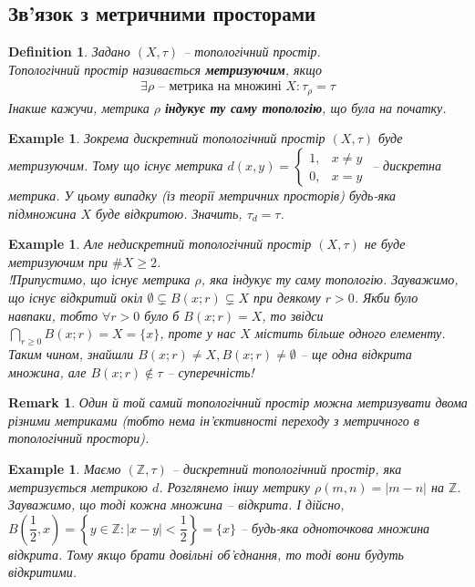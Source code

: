 \documentclass[a4paper, 10pt]{article}
\theoremstyle{theoremdd}
\newtheorem{definition}[theorem]{Definition}
\newtheorem{example}[theorem]{Example}
\newtheorem{remark}[theorem]{Remark}
\begin{document}
\subsection{Зв'язок з метричними просторами}
\begin{definition}
Задано $(X,\tau)$ -- топологічний простір.\\
Топологічний простір називається \textbf{метризуючим}, якщо
\begin{align*}
\exists \rho \text{ -- метрика на множині } X: \tau_\rho = \tau
\end{align*}
Інакше кажучи, метрика $\rho$ \textbf{індукує ту саму топологію}, що була на початку.
\end{definition}

\begin{example}
Зокрема дискретний топологічний простір $(X,\tau)$ буде метризуючим. Тому що існує метрика $d(x,y) = \begin{cases} 1, & x \neq y \\ 0, & x = y \end{cases}$ -- дискретна метрика. У цьому випадку (із теорії метричних просторів) будь-яка підмножина $X$ буде відкритою. Значить, $\tau_d = \tau$.
\end{example}

\begin{example}
Але недискретний топологічний простір $(X,\tau)$ не буде метризуючим при $\#X \geq 2$.\\
!Припустимо, що існує метрика $\rho$, яка індукує ту саму топологію. Зауважимо, що існує відкритий окіл $\emptyset \subsetneq B(x;r) \subsetneq X$ при деякому $r > 0$. Якби було навпаки, тобто $\forall r > 0$ було б $B(x;r) = X$, то звідси $\displaystyle\bigcap_{r \geq 0} B(x;r) = X = \{x\}$, проте у нас $X$ містить більше одного елементу.\\
Таким чином, знайшли $B(x;r) \neq X, B(x;r) \neq \emptyset$ -- ще одна відкрита множина, але $B(x;r) \notin \tau$ -- суперечність!
\end{example}

\begin{remark}
Один й той самий топологічний простір можна метризувати двома різними метриками (тобто нема ін'єктивності переходу з метричного в топологічний простори).
\end{remark}

\begin{example}
\label{two_metric_spaces_same_topology}
Маємо $(\mathbb{Z},\tau)$ -- дискретний топологічний простір, яка метризується метрикою $d$. Розглянемо іншу метрику $\rho(m,n) = |m-n|$ на $\mathbb{Z}$. Зауважимо, що тоді кожна множина -- відкрита. І дійсно, $B\left( \dfrac{1}{2},x \right) = \left\{ y \in \mathbb{Z} : |x-y| < \dfrac{1}{2} \right\} = \{x\}$ -- будь-яка одноточкова множина відкрита. Тому якщо брати довільні об'єднання, то тоді вони будуть відкритими.
\end{example}
\end{document}
